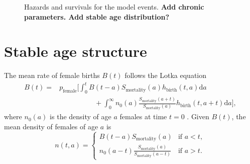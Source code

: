 \documentclass[12pt]{article}
\newcommand{\md}{\mathrm{d}}
\begin{document}
\begin{figure}
  \centering
  
  \caption{Hazards and survivals for the model events.
    \textbf{Add chronic parameters.
      Add stable age distribution?}}
  \label{fig:distributions}
\end{figure}


\section{Stable age structure}
\label{stable_age_structure}

The mean rate of female births $B(t)$ follows the Lotka equation
\begin{equation}
  \label{lotka}
  \begin{split}
    B(t) =&
    p_{\text{female}} \bigg[
      \int_0^t B(t - a)
      S_{\text{mortality}}(a)
      h_{\text{birth}}(t, a) \md a
    \\
    & \quad\quad\quad\quad\quad {} +
      \int_0^{\infty} n_0(a)
      \frac{S_{\text{mortality}}(a + t)}{S_{\text{mortality}}(a)}
      h_{\text{birth}}(t, a + t) \md a
    \bigg],
  \end{split}
\end{equation}
where $n_0(a)$ is the density of age $a$ females at time $t = 0$
\citetext{\citealp[Chapter VI, Section 29 on
  pp.~159--161]{harris_1963};
  \citealp[Chapter 20 on pp.~353--364]{kot_01}}.
Given $B(t)$, the mean density of females of age $a$ is
\begin{equation}
  n(t, a) =
  \begin{cases}
    B(t - a) S_{\text{mortality}}(a)
    & \text{if $a < t$},
    \\
    n_0(a - t)
    \frac{S_{\text{mortality}}(a)}{S_{\text{mortality}}(a - t)}
    & \text{if $a > t$}.
  \end{cases}
\end{equation}
\end{document}
